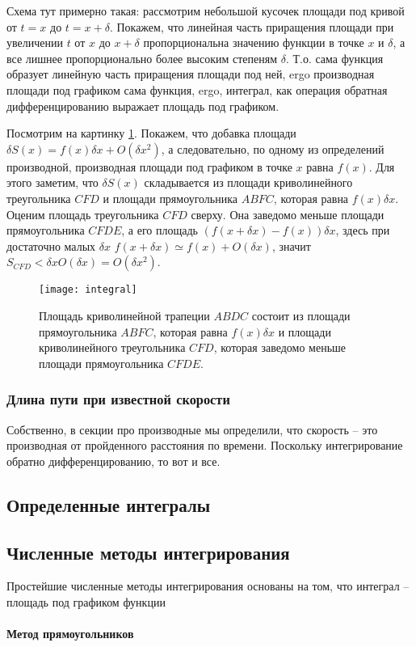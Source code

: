 \documentclass{article}
\begin{document}
Схема тут примерно такая: рассмотрим небольшой кусочек площади под
кривой от $t=x$ до $t=x+\delta$. Покажем, что линейная часть
приращения площади при увеличении $t$ от $x$ до $x+\delta$
пропорциональна значению функции в точке $x$ и $\delta$, а все лишнее
пропорционально более высоким степеням $\delta$. Т.о. сама функция
образует линейную часть приращения площади под ней, ergo производная
площади под графиком сама функция, ergo, интеграл, как операция
обратная дифференцированию выражает площадь под графиком.

Посмотрим на картинку \ref{fig-integral}. Покажем, что добавка площади $\delta S(x) = f(x)\delta x + O(\delta x^2)$, а следовательно, по одному из определений производной, производная площади под графиком в точке $x$ равна $f(x)$. Для этого заметим, что $\delta S(x)$ складывается из площади криволинейного треугольника $CFD$ и площади прямоугольника $ABFC$, которая равна $f(x)\delta x$. Оценим площадь треугольника $CFD$ сверху. Она заведомо меньше площади прямоугольника $CFDE$, а его площадь $(f(x+\delta x)-f(x))\delta x$, здесь при достаточно малых $\delta x$  $f(x+\delta x) \simeq f(x)+O(\delta x)$, значит $S_{CFD}<\delta x O(\delta x) = O(\delta x^2)$.   

\begin{figure}
  \texttt{[image: integral]}
  \caption{\label{fig-integral}Площадь криволинейной трапеции $ABDC$ состоит из площади прямоугольника $ABFC$, которая равна $f(x) \delta x$ и площади криволинейного треугольника $CFD$, которая заведомо меньше площади прямоугольника $CFDE$. }
\end{figure}

\subsubsection{Длина пути при известной скорости}
Собственно, в секции про производные мы определили, что скорость -- это производная от пройденного расстояния по времени. Поскольку интегрирование обратно дифференцированию, то вот и все.
\subsection{Определенные интегралы}
\subsection{Численные методы интегрирования}
Простейшие численные методы интегрирования основаны на том, что интеграл -- площадь под графиком функции
\paragraph{Метод прямоугольников}
\end{document}
